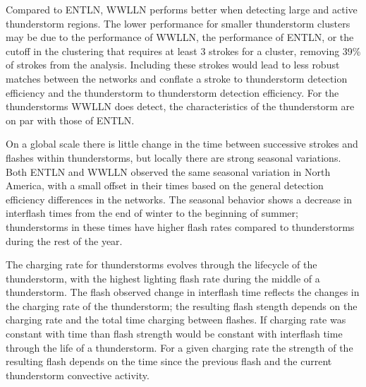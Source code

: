 
Compared to ENTLN, WWLLN performs better when detecting large and active thunderstorm regions.
The lower performance for smaller thunderstorm clusters may be due to the performance of WWLLN, the performance of ENTLN, or the cutoff in the clustering that requires at least 3 strokes for a cluster, removing 39\% of strokes from the analysis.
Including these strokes would lead to less robust matches between the networks and conflate a stroke to thunderstorm detection efficiency and the thunderstorm to thunderstorm detection efficiency.
For the thunderstorms WWLLN does detect, the characteristics of the thunderstorm are on par with those of ENTLN.


On a global scale there is little change in the time between successive strokes and flashes within thunderstorms, but locally there are strong seasonal variations.
Both ENTLN and WWLLN observed the same seasonal variation in North America, with a small offset in their times based on the general detection efficiency differences in the networks.
The seasonal behavior shows a decrease in interflash times from the end of winter to the beginning of summer; thunderstorms in these times have higher flash rates compared to thunderstorms during the rest of the year.

The charging rate for thunderstorms evolves through the lifecycle of the thunderstorm, with the highest lighting flash rate during the middle of a thunderstorm.
The flash observed change in interflash time reflects the changes in the charging rate of the thunderstorm; the resulting flash stength depends on the charging rate and the total time charging between flashes.
If charging rate was constant with time than flash strength would be constant with interflash time through the life of a thunderstorm.
For a given charging rate the strength of the resulting flash depends on the time since the previous flash and the current thunderstorm convective activity.
